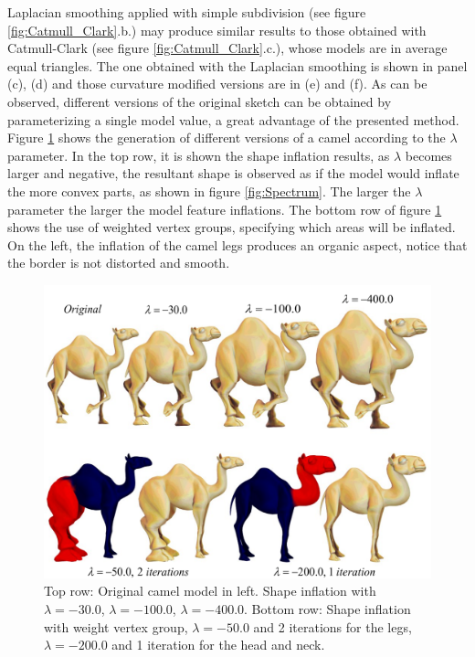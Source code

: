 \documentclass[10pt, conference]{IEEEtran}
\begin{document}
Laplacian smoothing applied with simple subdivision (see figure \ref{fig:Catmull_Clark}.b.)
may produce similar results to those obtained with Catmull-Clark (see
figure \ref{fig:Catmull_Clark}.c.), whose models are in average equal
triangles. The one obtained with the Laplacian smoothing is shown
in panel (c), (d) and those curvature modified versions are in (e)
and (f). As can be observed, different versions of the original sketch
can be obtained by parameterizing a single model value, a great advantage
of the presented method. Figure \ref{fig:camello_enhanced} shows
the generation of different versions of a camel according to the $\lambda$
parameter. In the top row, it is shown the shape inflation results,
as $\lambda$ becomes larger and negative, the resultant shape is
observed as if the model would inflate the more convex parts, as shown
in figure \ref{fig:Spectrum}. The larger the $\lambda$ parameter
the larger the model feature inflations. The bottom row of figure
\ref{fig:camello_enhanced} shows the use of weighted vertex groups,
specifying which areas will be inflated. On the left, the inflation
of the camel legs produces an organic aspect, notice that the border
is not distorted and smooth.

\begin{figure}
\includegraphics[width=1\columnwidth]{figs/camello_enhanced2}

\caption{\label{fig:camello_enhanced}Top row: Original camel model in left.
Shape inflation with $\lambda=-30.0$, $\lambda=-100.0$, $\lambda=-400.0$.
Bottom row: Shape inflation with weight vertex group, $\lambda=-50.0$
and 2 iterations for the legs, $\lambda=-200.0$ and 1 iteration for
the head and neck.}
\end{figure}
\end{document}
